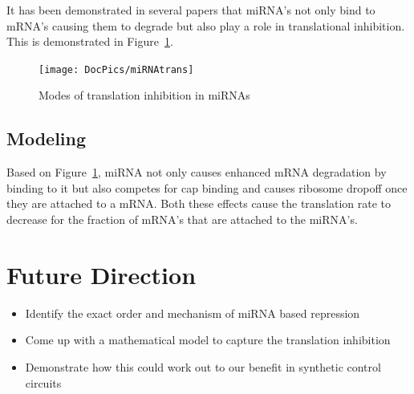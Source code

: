 \documentclass{article}
\begin{document}
It has been demonstrated in several papers that miRNA's not only bind to mRNA's causing them to degrade but also play a role in translational inhibition. This is demonstrated in Figure~\ref{miRNAtrans}. 
\begin{figure}[h!]
\centering
\texttt{[image: DocPics/miRNAtrans]}
\caption{Modes of translation inhibition in miRNAs}
\label{miRNAtrans}
\end{figure}
\subsection{Modeling}
Based on Figure~\ref{miRNAtrans}, miRNA not only causes enhanced mRNA degradation by binding to it but also competes for cap binding and causes ribosome dropoff once they are attached to a mRNA. Both these effects cause the translation rate to decrease for the fraction of mRNA's that are attached to the miRNA's. 


\section{Future Direction}

\begin{itemize}
\item Identify the exact order and mechanism of miRNA based repression 
\item Come up with a mathematical model to capture the translation inhibition 
\item Demonstrate how this could work out to our benefit in synthetic control circuits
\end{itemize}
\end{document}
